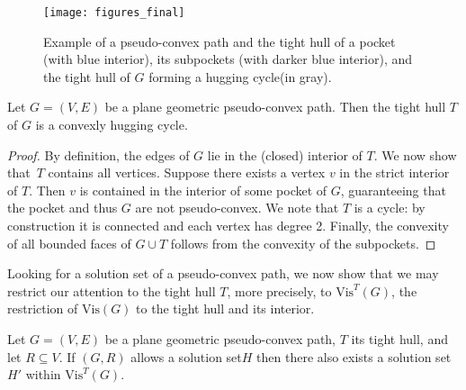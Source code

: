 \documentclass[a4paper,runningheads,cleveref,thm-restate]{lipics-v2021}
\newcommand{\Vis}[1]{\ensuremath{\mathrm{Vis}(#1)}}
\newcommand{\VisT}[1]{\ensuremath{\mathrm{Vis}^T(#1)}}
\newcommand{\hset}{solution set\xspace}
\newcommand{\pseudoconvex}{pseudo-convex\xspace}
\newcommand{\hug}{hugging cycle\xspace}
\begin{document}
\begin{figure}[hbt]
		\centering
		\texttt{[image: figures\_final]}
	\caption{Example of a \pseudoconvex path and the tight hull of a pocket (with blue interior), its subpockets (with darker blue interior), and the tight hull of $G$ forming a \hug (in gray).}
	\label{fig:qConvexB}
\end{figure}

\begin{lemma}
	\label{lemma:hug}
	Let $G=(V,E)$ be a plane geometric \pseudoconvex path. Then the tight hull $T$ of $G$ is a convexly \hug.
\end{lemma}
\begin{proof}
	 By definition, the edges of $G$ lie in the (closed) interior of $T$. 
	 We now show that~$T$ contains all vertices. 
	 Suppose there exists a vertex $v$ in the strict interior of $T$. 
	 Then $v$ is contained in the interior of some pocket of $G$, guaranteeing that the pocket and thus $G$ are not \pseudoconvex.
	 We note that $T$ is a cycle: 
	 by construction it is connected and each vertex has degree 2. 
	 Finally, the convexity of all bounded faces of $G\cup T$ follows from the convexity of the subpockets.
\end{proof}


Looking for a \hset of a \pseudoconvex path, we now show that we may restrict our attention to the tight hull $T$, more precisely, to $\VisT{G}$, the restriction of \Vis{G} to the tight hull and its interior.
\begin{lemma}
\label{lemma:tightHull}
	Let $G=(V,E)$ be a plane geometric \pseudoconvex path, $T$ its tight hull, and let $R\subseteq V$. 
	If $(G,R)$ allows a \hset $H$ then there also exists a \hset $H'$ within $\VisT{G}$. %
\end{lemma}
\end{document}
